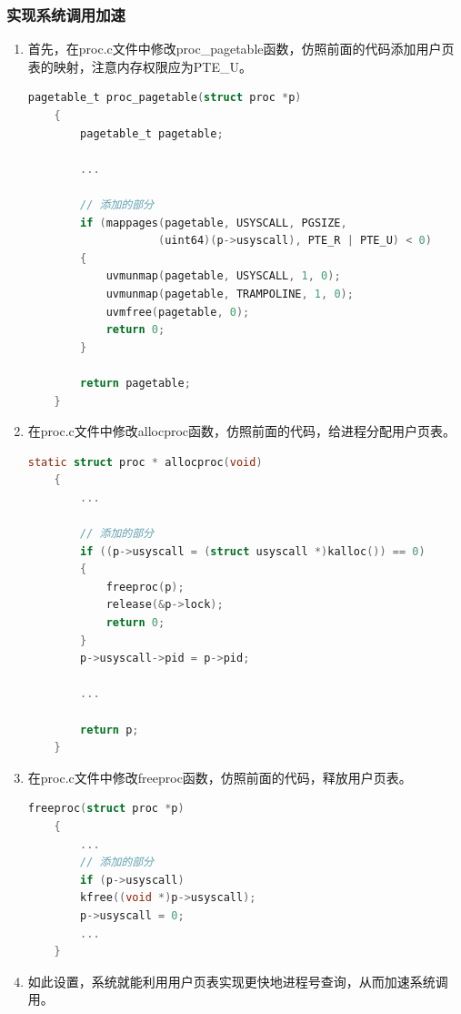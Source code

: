 \subsubsection{实现系统调用加速}
\begin{enumerate}
    \item 首先，在proc.c文件中修改proc\_pagetable函数，仿照前面的代码添加用户页表的映射，注意内存权限应为PTE\_U。
          \begin{lstlisting}[language=c, title=对proc\_pagetable函数的修改]
    pagetable_t proc_pagetable(struct proc *p)
    {
        pagetable_t pagetable;

        ...

        // 添加的部分
        if (mappages(pagetable, USYSCALL, PGSIZE,
                    (uint64)(p->usyscall), PTE_R | PTE_U) < 0)
        {
            uvmunmap(pagetable, USYSCALL, 1, 0);
            uvmunmap(pagetable, TRAMPOLINE, 1, 0);
            uvmfree(pagetable, 0);
            return 0;
        }

        return pagetable;
    }
    \end{lstlisting}
    \item 在proc.c文件中修改allocproc函数，仿照前面的代码，给进程分配用户页表。
          \begin{lstlisting}[language=c, title=对allocproc函数的修改]
    static struct proc * allocproc(void)
    {
        ...
    
        // 添加的部分
        if ((p->usyscall = (struct usyscall *)kalloc()) == 0)
        {
            freeproc(p);
            release(&p->lock);
            return 0;
        }
        p->usyscall->pid = p->pid;
    
        ...

        return p;
    }
    \end{lstlisting}
    \item 在proc.c文件中修改freeproc函数，仿照前面的代码，释放用户页表。
          \begin{lstlisting}[language=c, title=对freeproc函数的修改]
    freeproc(struct proc *p)
    {
        ...
        // 添加的部分
        if (p->usyscall)
        kfree((void *)p->usyscall);
        p->usyscall = 0;
        ...
    }
    \end{lstlisting}
    \item 如此设置，系统就能利用用户页表实现更快地进程号查询，从而加速系统调用。
\end{enumerate}

